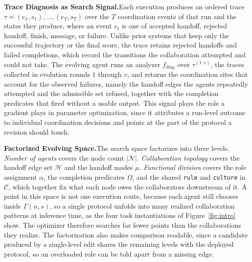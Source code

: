 \documentclass{article} %
\begin{document}
\textbf{Trace Diagnosis as Search Signal.}\quad Each execution produces an ordered trace $\tau=(e_1,s_1),\ldots,(e_T,s_T)$ over the $T$ coordination events of that run and the states they produce, where an event $e_t$ is one of accepted handoff, rejected handoff, finish, message, or failure. Unlike prior systems that keep only the successful trajectory or the final score, the trace retains rejected handoffs and failed completions, which record the transitions the collaboration attempted and could not take. The evolving agent runs an analyzer $f_{\mathrm{diag}}$ over $\tau^{(1{:}v)}$, the traces collected in evolution rounds $1$ through $v$, and returns the coordination sites that account for the observed failures, namely the handoff edges the agents repeatedly attempted and the admissible set refused, together with the completion predicates that fired without a usable output. This signal plays the role a gradient plays in parameter optimization, since it attributes a run-level outcome to individual coordination decisions and points at the part of the protocol a revision should touch.

\textbf{Factorized Evolving Space.}\quad The search space factorizes into three levels. \emph{Number of agents} covers the node count $|\mathcal{N}|$. \emph{Collaboration topology} covers the handoff edge set $\mathcal{H}$ and the handoff modes $\mu$. \emph{Functional division} covers the role assignment $\alpha$, the completion predicates $\Omega$, and the shared \texttt{rule} and \texttt{culture} in $\mathcal{C}$, which together fix what each node owes the collaborators downstream of it. A point in this space is not one execution route, because each agent still chooses inside $\Gamma(n,s)$, so a single protocol unfolds into many realized collaboration patterns at inference time, as the four task instantiations of Figure~\ref{fig:intro} show. The optimizer therefore searches far fewer points than the collaborations they realize. The factorization also makes comparison readable, since a candidate produced by a single-level edit shares the remaining levels with the deployed protocol, so an overloaded role can be told apart from a missing edge.
\end{document}
